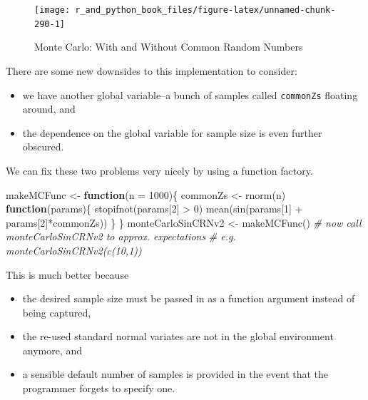 \documentclass[
  12pt,
  krantz2]{krantz}
\makeatletter
\newenvironment{Shaded}{\begin{snugshade}}{\end{snugshade}}
\newcommand{\AttributeTok}[1]{\textcolor[rgb]{0.61,0.61,0.61}{#1}}
\newcommand{\CommentTok}[1]{\textcolor[rgb]{0.37,0.37,0.37}{\textit{#1}}}
\newcommand{\ControlFlowTok}[1]{\textcolor[rgb]{0.27,0.27,0.27}{\textbf{#1}}}
\newcommand{\DecValTok}[1]{\textcolor[rgb]{0.06,0.06,0.06}{#1}}
\newcommand{\FunctionTok}[1]{\textcolor[rgb]{0,0,0}{#1}}
\newcommand{\NormalTok}[1]{#1}
\newcommand{\OtherTok}[1]{\textcolor[rgb]{0.37,0.37,0.37}{#1}}
\newcommand{\SpecialCharTok}[1]{\textcolor[rgb]{0,0,0}{#1}}
\providecommand{\tightlist}{%
  \setlength{\itemsep}{0pt}\setlength{\parskip}{0pt}}
\newenvironment{kframe}{%
\medskip{}
\setlength{\fboxsep}{.8em}
 \def\at@end@of@kframe{}%
 \ifinner\ifhmode%
  \def\at@end@of@kframe{\end{minipage}}%
  \begin{minipage}{\columnwidth}%
 \fi\fi%
 \def\FrameCommand##1{\hskip\@totalleftmargin \hskip-\fboxsep
 \colorbox{shadecolor}{##1}\hskip-\fboxsep
     \hskip-\linewidth \hskip-\@totalleftmargin \hskip\columnwidth}%
 \MakeFramed {\advance\hsize-\width
   \@totalleftmargin\z@ \linewidth\hsize
   \@setminipage}}%
 {\par\unskip\endMakeFramed%
 \at@end@of@kframe}
\renewenvironment{Shaded}{\begin{kframe}}{\end{kframe}}
\makeatother
\begin{document}
\begin{figure}

{\centering \texttt{[image: r\_and\_python\_book\_files/figure-latex/unnamed-chunk-290-1]} 

}

\caption{Monte Carlo: With and Without Common Random Numbers}\label{fig:unnamed-chunk-290}
\end{figure}

There are some new downsides to this implementation to consider:

\begin{itemize}
\tightlist
\item
  we have another global variable--a bunch of samples called \texttt{commonZs} floating around, and
\item
  the dependence on the global variable for sample size is even further obscured.
\end{itemize}

We can fix these two problems very nicely by using a function factory.

\begin{Shaded}
\begin{Highlighting}[]
\NormalTok{makeMCFunc }\OtherTok{\textless{}{-}} \ControlFlowTok{function}\NormalTok{(}\AttributeTok{n =} \DecValTok{1000}\NormalTok{)\{}
\NormalTok{  commonZs }\OtherTok{\textless{}{-}} \FunctionTok{rnorm}\NormalTok{(n)}
  \ControlFlowTok{function}\NormalTok{(params)\{}
    \FunctionTok{stopifnot}\NormalTok{(params[}\DecValTok{2}\NormalTok{] }\SpecialCharTok{\textgreater{}} \DecValTok{0}\NormalTok{) }
    \FunctionTok{mean}\NormalTok{(}\FunctionTok{sin}\NormalTok{(params[}\DecValTok{1}\NormalTok{] }\SpecialCharTok{+}\NormalTok{ params[}\DecValTok{2}\NormalTok{]}\SpecialCharTok{*}\NormalTok{commonZs))    }
\NormalTok{  \}  }
\NormalTok{\}}
\NormalTok{monteCarloSinCRNv2 }\OtherTok{\textless{}{-}} \FunctionTok{makeMCFunc}\NormalTok{()}
\CommentTok{\# now call monteCarloSinCRNv2 to approx. expectations}
\CommentTok{\# e.g. monteCarloSinCRNv2(c(10,1))}
\end{Highlighting}
\end{Shaded}

This is much better because

\begin{itemize}
\tightlist
\item
  the desired sample size must be passed in as a function argument instead of being captured,
\item
  the re-used standard normal variates are not in the global environment anymore, and
\item
  a sensible default number of samples is provided in the event that the programmer forgets to specify one.
\end{itemize}
\end{document}
